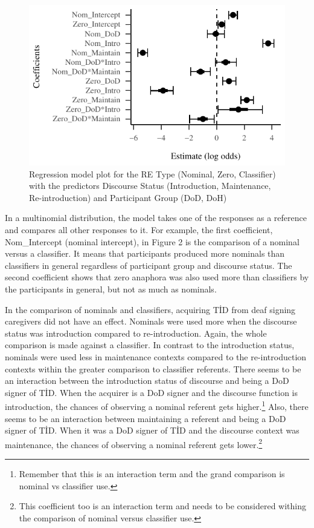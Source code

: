\documentclass[]{elsarticle} %
\begin{document}
\begin{figure}
\centering
\includegraphics{revised_manuscript_files/figure-latex/model-gram-1.pdf}
\caption{Regression model plot for the RE Type (Nominal, Zero,
Classifier) with the predictors Discourse Status (Introduction,
Maintenance, Re-introduction) and Participant Group (DoD, DoH)}
\end{figure}

In a multinomial distribution, the model takes one of the responses as a
reference and compares all other responses to it. For example, the first
coefficient, Nom\_Intercept (nominal intercept), in Figure 2 is the
comparison of a nominal versus a classifier. It means that participants
produced more nominals than classifiers in general regardless of
participant group and discourse status. The second coefficient shows
that zero anaphora was also used more than classifiers by the
participants in general, but not as much as nominals.

In the comparison of nominals and classifiers, acquiring TİD from deaf
signing caregivers did not have an effect. Nominals were used more when
the discourse status was introduction compared to re-introduction.
Again, the whole comparison is made against a classifier. In contrast to
the introduction status, nominals were used less in maintenance contexts
compared to the re-introduction contexts within the greater comparison
to classifier referents. There seems to be an interaction between the
introduction status of discourse and being a DoD signer of TİD. When the
acquirer is a DoD signer and the discourse function is introduction, the
chances of observing a nominal referent gets
higher.\footnote{Remember that this is an interaction term and the grand comparison is nominal vs classifier use.}
Also, there seems to be an interaction between maintaining a referent
and being a DoD signer of TİD. When it was a DoD signer of TİD and the
discourse context was maintenance, the chances of observing a nominal
referent gets
lower.\footnote{This coefficient too is an interaction term and needs to be considered withing the comparison of nominal versus classifier use.}
\end{document}
